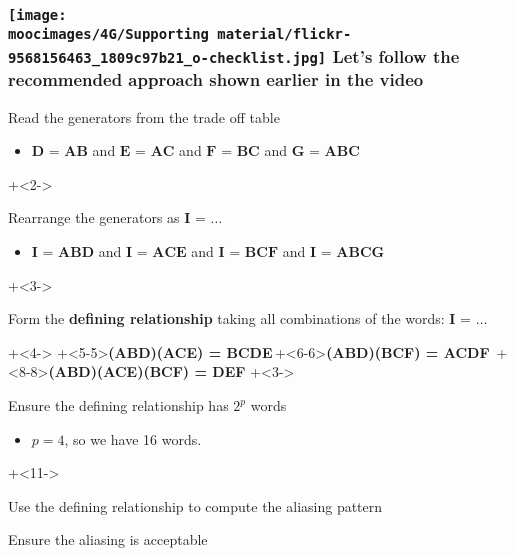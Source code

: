 \documentclass[handout,11pt,aspectratio=169,mathserif]{beamer}
\begin{document}
\begin{frame}\frametitle{\texttt{[image: \\moocimages/4G/Supporting material/flickr-9568156463\_1809c97b21\_o-checklist.jpg]} Let's follow the recommended approach shown earlier in the video}
	
	\begin{enumerate}
		\item	Read the generators from the trade off table 
			\begin{itemize}
				\item		$\textbf{D = AB}$  and $\textbf{E = AC}$ and $\textbf{F = BC}$  and $\textbf{G = ABC}$ 
			\end{itemize}
\onslide+<2->{
		\item	Rearrange the generators as  $\textbf{I = \ldots}$
			\begin{itemize}
				\item	$\textbf{I = ABD}$ and $\textbf{I = ACE}$ and $\textbf{I = BCF}$ and $\textbf{I = ABCG}$
			\end{itemize}
}
\onslide+<3->{
		\item	Form the {\color{purple}\textbf{defining relationship}} taking all combinations of the words: $\textbf{I = \ldots}$
}
\onslide+<4->{
}
\onslide+<5-5>{\textbf{(ABD)(ACE) = BCDE}}\,\onslide+<6-6>{\textbf{(ABD)(BCF) = ACDF}}\, \onslide+<8-8>{\textbf{(ABD)(ACE)(BCF) = DEF}}
\onslide+<3->{
		\item	Ensure the defining relationship has $2^p$ words
			\begin{itemize}
				\item	$p=4$, so we have 16 words.
			\end{itemize}
}
\onslide+<11->{
		\item	Use the defining relationship to compute the aliasing pattern
		\item	Ensure the aliasing is acceptable
}		
	\end{enumerate}
\end{frame}
\end{document}
